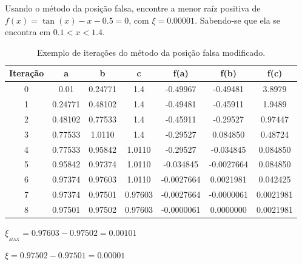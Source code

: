 \begin{example}
 Usando o método da posição falsa, encontre a menor raíz positiva de $f(x) = \tan(x) - x - 0.5 = 0$, com $\xi = 0.00001$. Sabendo-se que ela se encontra em $ 0.1 < x < 1.4$.

\begin{table}[htp]
\footnotesize
	\centering
		
		\begin{tabular}{|c|c|c|c|c|c|c|}
		\hline		
		\textbf{Iteração} & \textbf{a} & \textbf{b} & \textbf{c} & \textbf{f(a)} & \textbf{f(b)} & \textbf{f(c)}\\
		\hline \hline 
		0 & 0.01 & 0.24771 & 1.4 & -0.49967 & -0.49481 & 3.8979\\
		\hline 
		1 & 0.24771 & 0.48102 & 1.4 & -0.49481 & -0.45911 & 1.9489\\
		\hline 
		2 & 0.48102 & 0.77533 & 1.4 & -0.45911 & -0.29527 & 0.97447\\
		\hline 
		3 & 0.77533 & 1.0110 & 1.4 & -0.29527 & 0.084850 & 0.48724\\
		\hline 
		4 & 0.77533 & 0.95842 & 1.0110 & -0.29527 & -0.034845 & 0.084850\\
		\hline 
		5 & 0.95842 & 0.97374 & 1.0110 & -0.034845 & -0.0027664 & 0.084850\\
		\hline  
		6 & 0.97374 & 0.97603 & 1.0110 & -0.0027664 & 0.0021981 & 0.042425\\
		\hline 
		7 & 0.97374 & 0.97501 & 0.97603 & -0.0027664 & -0.0000061 & 0.0021981\\
		\hline
		8 & 0.97501 & 0.97502 & 0.97603 & -0.0000061 & 0.0000000 & 0.0021981\\
		\hline
		\end{tabular}
	\caption{Exemplo de iterações do método da posição falsa modificado.}
	\label{tab:posicaofalsamodificado}
\end{table}

$\xi_{_{MAX}} = 0.97603 - 0.97502 = 0.00101$

$\xi = 0.97502 - 0.97501 = 0.00001$

\end{example}